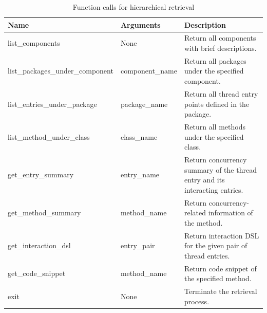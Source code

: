 \begin{table}[h]
\centering
\caption{Function calls for hierarchical retrieval}
\vspace{-8pt}
\label{tab:function_calls}
\scriptsize
\begin{tabular}{l|l|p{7.5cm}}
\hline
\textbf{Name} & \textbf{Arguments} & \textbf{Description} \\
\hline
list\_components & None &
Return all components with brief descriptions. \\
\hline
list\_packages\_under\_component & component\_name &
Return all packages under the specified component. \\
\hline
list\_entries\_under\_package & package\_name &
Return all thread entry points defined in the package. \\
\hline
list\_method\_under\_class & class\_name &
Return all methods under the specified class. \\
\hline
get\_entry\_summary & entry\_name &
Return concurrency summary of the thread entry and its interacting entries. \\
\hline
get\_method\_summary & method\_name &
Return concurrency-related information of the method. \\
\hline
get\_interaction\_dsl & entry\_pair &
Return interaction DSL for the given pair of thread entries. \\
\hline
get\_code\_snippet & method\_name &
Return code snippet of the specified method. \\
\hline
exit & None &
Terminate the retrieval process. \\
\hline
\end{tabular}
\end{table}
\vspace{-8pt}